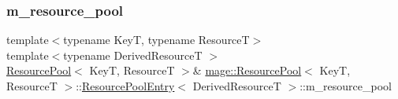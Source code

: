 \hypertarget{structmage_1_1_resource_pool_1_1_resource_pool_entry_a657a97767707dbb045f49440dff4c126}{}\label{structmage_1_1_resource_pool_1_1_resource_pool_entry_a657a97767707dbb045f49440dff4c126} 
\subsubsection{\texorpdfstring{m\+\_\+resource\+\_\+pool}{m\_resource\_pool}}
{\footnotesize\ttfamily template$<$typename KeyT, typename ResourceT$>$ \\
template$<$typename Derived\+ResourceT $>$ \\
\hyperlink{classmage_1_1_resource_pool}{Resource\+Pool}$<$ KeyT, ResourceT $>$\& \hyperlink{classmage_1_1_resource_pool}{mage\+::\+Resource\+Pool}$<$ KeyT, ResourceT $>$\+::\hyperlink{structmage_1_1_resource_pool_1_1_resource_pool_entry}{Resource\+Pool\+Entry}$<$ Derived\+ResourceT $>$\+::m\+\_\+resource\+\_\+pool\hspace{0.3cm}{\ttfamily [private]}}

